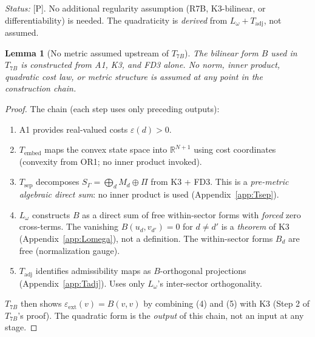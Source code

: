 \documentclass[11pt]{article}
\newtheorem{lemma}[theorem]{Lemma}
\theoremstyle{definition}
\begin{document}
\smallskip\noindent\textit{Status:} [P].  No additional regularity
assumption (R7B, K3-bilinear, or differentiability) is needed.  The
quadraticity is \emph{derived} from $L_\omega + T_{\mathrm{adj}}$, not
assumed.

\begin{lemma}[No metric assumed upstream of $T_{7B}$]\label{lem:T7B_provenance}
The bilinear form $B$ used in $T_{7B}$ is constructed from A1, K3, and
FD3 alone.  No norm, inner product, quadratic cost law, or metric
structure is assumed at any point in the construction chain.
\end{lemma}

\begin{proof}
The chain (each step uses only preceding outputs):
\begin{enumerate}[nosep,label=(\arabic*)]
  \item A1 provides real-valued costs $\varepsilon(d) > 0$.
  \item $T_{\mathrm{embed}}$ maps the convex state space into
  $\mathbb{R}^{N+1}$ using cost coordinates (convexity from OR1; no
  inner product invoked).
  \item $T_{\mathrm{sep}}$ decomposes $S_\Gamma = \bigoplus_d M_d
  \oplus \Pi$ from K3 + FD3.  This is a \emph{pre-metric algebraic
  direct sum}: no inner product is used (Appendix~\ref{app:Tsep}).
  \item $L_\omega$ constructs $B$ as a direct sum of free within-sector
  forms with \emph{forced} zero cross-terms.  The vanishing
  $B(u_d, v_{d'}) = 0$ for $d \ne d'$ is a \emph{theorem} of K3
  (Appendix~\ref{app:Lomega}), not a definition.  The within-sector
  forms $B_d$ are free (normalization gauge).
  \item $T_{\mathrm{adj}}$ identifies admissibility maps as $B$-orthogonal
  projections (Appendix~\ref{app:Tadj}).  Uses only $L_\omega$'s
  inter-sector orthogonality.
\end{enumerate}
$T_{7B}$ then shows $\varepsilon_{\mathrm{ext}}(v) = B(v,v)$ by
combining (4) and (5) with K3 (Step 2 of $T_{7B}$'s proof).  The
quadratic form is the \emph{output} of this chain, not an input at
any stage.
\end{proof}
\end{document}
